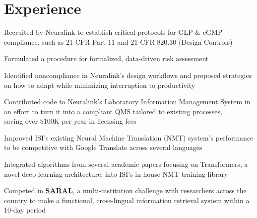 \documentclass[letterpaper]{deedy-resume} %
\begin{document}
\begin{minipage}[t]{0.66\textwidth} %


\section{Experience}

\vspace{\topsep} %
\vspace{\topsep}

\begin{tightitemize}
\item Recruited by Neuralink to establish critical protocols for GLP \& cGMP compliance, such as 21 CFR Part 11 and 21 CFR 820.30 (Design Controls)
\item Formulated a procedure for formalized, data-driven risk assessment
\item Identified noncompliance in Neuralink's design workflows and proposed strategies on how to adapt while minimizing interruption to productivity
\item Contributed code to Neuralink's Laboratory Information Management System in an effort to turn it into a compliant QMS tailored to existing processes, \\
saving over \$100K per year in licensing fees
\end{tightitemize}

\sectionspace %


\vspace{\topsep}

\begin{tightitemize}
\item Improved ISI's existing Neural Machine Translation (NMT) system’s performance to be competitive with Google Translate across several languages
\item Integrated algorithms from several academic papers focusing on Transformers, a novel deep learning architecture, into ISI’s in-house NMT training library 
\item Competed in \href{https://viterbischool.usc.edu/news/2018/01/usc-isi-develop-translation-information-retrieval-system-uncommon-languages/}{\bf SARAL}, a multi-institution challenge with researchers across the country to make a functional, cross-lingual information retrieval system within a 10-day period


\end{tightitemize}
\end{minipage}
\end{document}
